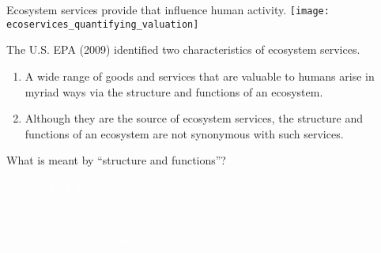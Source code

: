 \documentclass[t,handout]{beamer}  %
\begin{document}

\begin{frame}[t]{Ecosystem services provide  that influence human activity.}
	\texttt{[image: ecoservices\_quantifying\_valuation]}
\end{frame}

\begin{frame}[t]{The U.S. EPA (2009) identified two characteristics of ecosystem services.}

	\begin{enumerate}

	\item A wide range of goods and services that are valuable to humans arise in myriad ways via the structure and functions of an ecosystem.

	\vspace*{\baselineskip}
		
	\item Although they are the source of ecosystem services, the structure and functions of an ecosystem are not synonymous with such services.
	
	\end{enumerate}
	
	\hangpara What is meant by “structure and functions”?

\end{frame}


{
\begin{frame}[b]{\textcolor{white}{Can you find Bonaire?}}

\hfill\tiny\textcolor{white}{kmusser, Wikimedia Commons.}
\end{frame}
}


{
\begin{frame}[b]

\hfill\tiny\textcolor{white}{Rebe Leubert, Flickr Creative Commons.}
\end{frame}
}
\end{document}
